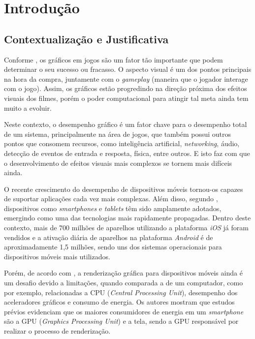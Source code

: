\chapter[Introdução]{Introdução}
\label{introduc}

\section{Contextualização e Justificativa}

	Conforme \cite{graphicsprog}, os gráficos em jogos são um fator tão importante que podem determinar o seu sucesso ou fracasso. O aspecto visual é um dos pontos principais na hora da compra, juntamente com o \textit{gameplay} (maneira que o jogador interage com o jogo). Assim, os gráficos estão progredindo na direção próxima dos efeitos visuais dos filmes, porém o poder computacional para atingir tal meta ainda tem muito a evoluir.

	 Neste contexto, o desempenho gráfico é um fator chave para o desempenho total de um sistema, principalmente na área de jogos, que também possui outros pontos que consomem recursos, como inteligência artificial, \textit{networking}, áudio, detecção de eventos de entrada e resposta, física, entre outros. E isto faz com que o desenvolvimento de efeitos visuais mais complexos se tornem mais difíceis ainda.

	O recente crescimento do desempenho de dispositivos móveis tornou-os capazes de suportar aplicações cada vez mais complexas. Além disso, segundo \cite{teapot}, dispositivos como \textit{smartphones} e \textit{tablets} têm sido amplamente adotados, emergindo como uma das tecnologias mais rapidamente propagadas. Dentro deste contexto, mais de 700 milhões de aparelhos utilizando a plataforma \textit{iOS} já foram vendidos e a ativação diária de aparelhos na plataforma \textit{Android} é de aproximadamente 1,5 milhões, sendo uns dos sistemas operacionais para dispositivos móveis mais utilizados.

	 Porém, de acordo com \cite{x3d}, a renderização gráfica para dispositivos móveis ainda é um desafio devido a limitações, quando comparada a de um computador, como por exemplo, relacionadas a CPU (\textit{Central Processing Unit}), desempenho dos aceleradores gráficos e consumo de energia. Os autores \cite{teapot} mostram que estudos prévios evidenciam que os maiores consumidores de energia em um \textit{smartphone} são a  GPU (\textit{Graphics Processing Unit}) e a tela, sendo a GPU responsável por realizar o processo de renderização.

